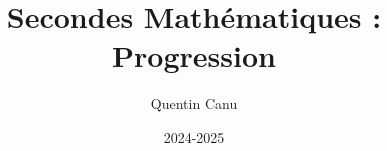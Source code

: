 \usepackage{main}

\title{Secondes Mathématiques : Progression}
\author{Quentin Canu}
\date{2024-2025}


\maketitle
